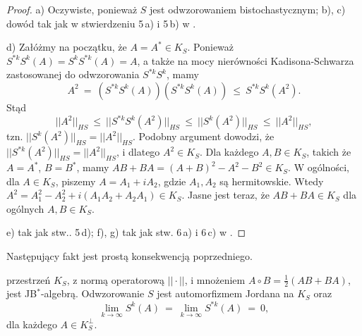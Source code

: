 {\begin{proof}
a) Oczywiste, ponieważ $S$ jest odwzorowaniem bistochastycznym;
b), c) dowód tak jak w stwierdzeniu 5\,a) i 5\,b) w \cite{olkiewicz1999environment}.

d)  Załóżmy na początku, że $A = A^{*} \in K_{S}$.
Ponieważ $S^{*k} S^{k}(A) = S^{k} S^{*k}(A) = A$,
a także na mocy nierówności Kadisona-Schwarza zastosowanej do odwzorowania
$S^{*k} S^{k}$, mamy
\begin{equation}
A^{2} \: = \: \left( S^{*k} S^{k}(A) \right) \left( S^{*k} S^{k}(A) \right)
    \: \leq \: S^{*k} S^{k}(A^{2}).
\end{equation}
Stąd
\begin{equation}
||A^{2}||_{HS} \: \leq \: || S^{*k} S^{k}(A^{2}) ||_{HS} \: \leq \:
    || S^{k}(A^{2}) ||_{HS} \: \leq \: ||A^{2}||_{HS},
\end{equation}
tzn. $|| S^{k}(A^{2}) ||_{HS} = ||A^{2}||_{HS}$.
Podobny argument dowodzi, że
$|| S^{*k}(A^{2}) ||_{HS} = ||A^{2}||_{HS}$,
i dlatego $A^{2} \in K_{S}$.
Dla każdego $A, B \in K_{S}$, takich że $A = A^{*}$, $B = B^{*}$,
mamy
$AB + BA = (A + B)^{2} - A^{2} - B^{2} \in K_{S}$.
W ogólności, dla $A \in K_{S}$, piszemy
$A = A_{1} + i A_{2}$, gdzie $A_{1}, A_{2}$ są hermitowskie.
Wtedy
$A^{2} = A_{1}^{2} - A_{2}^{2} + i(A_{1} A_{2} + A_{2} A_{1}) \in K_{S}$.
Jasne jest teraz, że $AB+BA \in K_{S}$ dla ogólnych $A,B \in K_{S}$.

e) tak jak stw.. 5\,d);
f), g) tak jak stw. 6\,a) i 6\,c) w
\cite{olkiewicz1999environment}.
\end{proof}

Następujący fakt jest prostą konsekwencją poprzedniego.

\begin{Corollary}
\label{cor:KisJordanAlgebra}
przestrzeń $K_{S}$,
z normą operatorową $|| \cdot ||$,
i mnożeniem  $A \circ B = \frac{1}{2}(AB + BA)$,
jest JB$^{*}$-algebrą.
Odwzorowanie $S$ jest automorfizmem Jordana na $K_{S}$ oraz
\begin{equation}
\label{eq:SGoesTo0OnKOrth}
    \lim \limits_{k\rightarrow \infty} S^{k}(A)  \: = \:
    \lim \limits_{k\rightarrow \infty} S^{*k}(A) \: = \: 0,
\end{equation}
dla każdego $A \in K_{S}^{\perp}$.
\end{Corollary}

}
